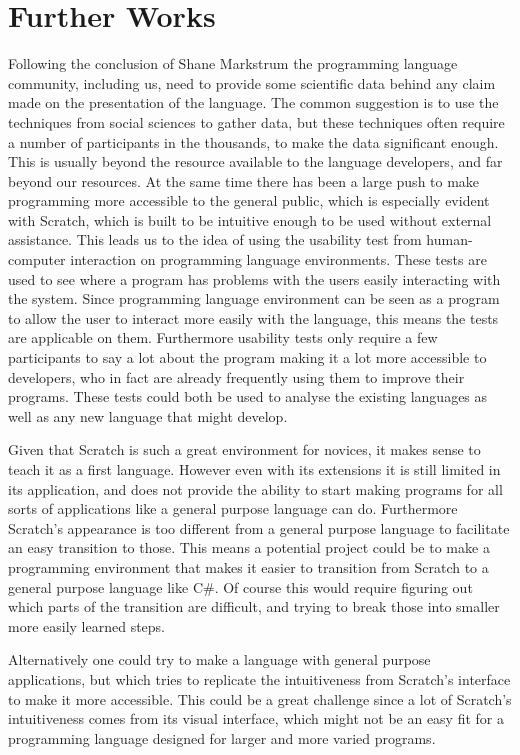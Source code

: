 \section{Further Works}
\label{sec:further_works}
Following the conclusion of Shane Markstrum\cite{ShaneMarkstrum10} the programming language community, including us, need to provide some scientific data behind any claim made on the presentation of the language.
The common suggestion is to use the techniques from social sciences to gather data\cite{Socio-plt}, but these techniques often require a number of participants in the thousands, to make the data significant enough.
This is usually beyond the resource available to the language developers, and far beyond our resources.
At the same time there has been a large push to make programming more accessible to the general public, which is especially evident with Scratch, which is built to be intuitive enough to be used without external assistance.
This leads us to the idea of using the usability test from human-computer interaction on programming language environments.
These tests are used to see where a program has problems with the users easily interacting with the system.
Since programming language environment can be seen as a program to allow the user to interact more easily with the language, this means the tests are applicable on them.
Furthermore usability tests only require a few participants to say a lot about the program making it a lot more accessible to developers, who in fact are already frequently using them to improve their programs.
These tests could both be used to analyse the existing languages as well as any new language that might develop.

Given that Scratch is such a great environment for novices, it makes sense to teach it as a first language.
However even with its extensions it is still limited in its application, and does not provide the ability to start making programs for all sorts of applications like a general purpose language can do.
Furthermore Scratch's appearance is too different from a general purpose language to facilitate an easy transition to those.
This means a potential project could be to make a programming environment that makes it easier to transition from Scratch to a general purpose language like C\#.
Of course this would require figuring out which parts of the transition are difficult, and trying to break those into smaller more easily learned steps.

Alternatively one could try to make a language with general purpose applications, but which tries to replicate the intuitiveness from Scratch's interface to make it more accessible.
This could be a great challenge since a lot of Scratch's intuitiveness comes from its visual interface, which might not be an easy fit for a programming language designed for larger and more varied programs.

